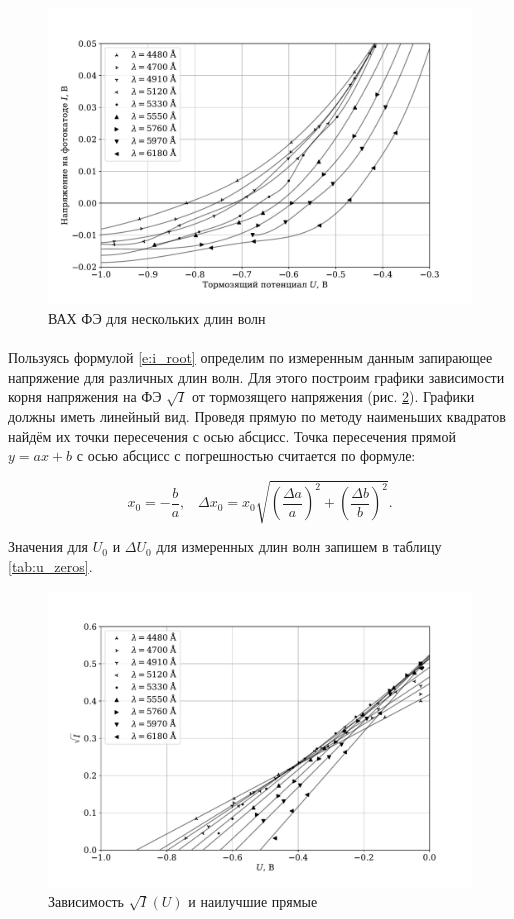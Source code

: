 \documentclass[a4paper,12pt]{article}
\begin{document}
\begin{figure}[h]
\centering
\includegraphics[width=\textwidth]{plot_ends.pdf}
\caption{ВАХ ФЭ для нескольких длин волн}
\label{fig:ends}
\end{figure}

\paragraph{} Пользуясь формулой \eqref{e:i_root} определим по измеренным данным запирающее напряжение для различных длин волн. Для этого построим графики зависимости корня напряжения на ФЭ $\sqrt{I}$ от тормозящего напряжения (рис. \ref{fig:roots}). Графики должны иметь линейный вид. Проведя прямую по методу наименьших квадратов найдём их точки пересечения с осью абсцисс. Точка пересечения прямой $y = ax + b$ с осью абсцисс с погрешностью считается по формуле:

\[
x_0 = - \frac{b}{a}, \;\;\; \Delta x_0 = x_0 \sqrt{\left( \frac{\Delta a}{a} \right) ^ 2 + \left( \frac{\Delta b}{b} \right) ^ 2}.
\]

\noindent Значения для $U_0$ и $\Delta U_0$ для измеренных длин волн запишем в таблицу \ref{tab:u_zeros}.

\begin{figure}[h]
\centering
\includegraphics[width=\textwidth]{plot_roots.pdf}
\caption{Зависимость $\sqrt{I}(U)$ и наилучшие прямые}
\label{fig:roots}
\end{figure}
\end{document}
